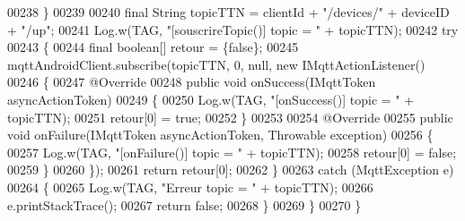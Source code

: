 \begin{DoxyCode}
00238         \}
00239 
00240         \textcolor{keyword}{final} String topicTTN = clientId + \textcolor{stringliteral}{"/devices/"} + deviceID + \textcolor{stringliteral}{"/up"};
00241         Log.w(TAG, \textcolor{stringliteral}{"[souscrireTopic()] topic = "} + topicTTN);
00242         \textcolor{keywordflow}{try}
00243         \{
00244             \textcolor{keyword}{final} \textcolor{keywordtype}{boolean}[] retour = \{\textcolor{keyword}{false}\};
00245             mqttAndroidClient.subscribe(topicTTN, 0, null, \textcolor{keyword}{new} IMqttActionListener()
00246             \{
00247                 @Override
00248                 \textcolor{keyword}{public} \textcolor{keywordtype}{void} onSuccess(IMqttToken asyncActionToken)
00249                 \{
00250                     Log.w(TAG, \textcolor{stringliteral}{"[onSuccess()] topic = "} + topicTTN);
00251                     retour[0] = \textcolor{keyword}{true};
00252                 \}
00253 
00254                 @Override
00255                 \textcolor{keyword}{public} \textcolor{keywordtype}{void} onFailure(IMqttToken asyncActionToken, Throwable exception)
00256                 \{
00257                     Log.w(TAG, \textcolor{stringliteral}{"[onFailure()] topic = "} + topicTTN);
00258                     retour[0] = \textcolor{keyword}{false};
00259                 \}
00260             \});
00261             \textcolor{keywordflow}{return} retour[0];
00262         \}
00263         \textcolor{keywordflow}{catch} (MqttException e)
00264         \{
00265             Log.w(TAG, \textcolor{stringliteral}{"Erreur topic = "} + topicTTN);
00266             e.printStackTrace();
00267             \textcolor{keywordflow}{return} \textcolor{keyword}{false};
00268         \}
00269     \}
00270 \}
\end{DoxyCode}
